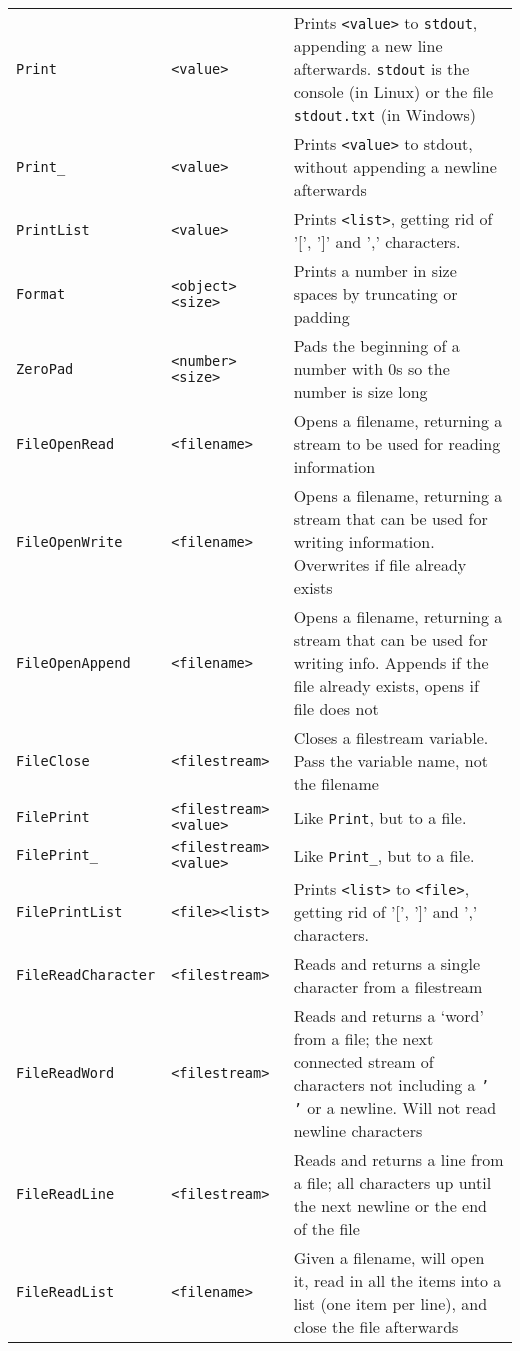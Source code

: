 \begin{longtable}{p{3cm}p{3cm}p{6cm}}
\verb+Print+ &\verb+<value>+ &Prints \verb+<value>+ to \texttt{stdout}, appending a new line afterwards. \texttt{stdout} is the console (in Linux) or the file \texttt{stdout.txt} (in Windows)\\ 
\verb+Print_+ &\verb+<value>+ &Prints \verb+<value>+ to stdout, without appending a newline afterwards\\ 
\verb+PrintList+&\verb+<value>+ &Prints \verb+<list>+, getting rid of '[', ']' and ',' characters.\\ 
\verb+Format+ &\verb+<object>+ \verb+<size>+ &Prints a number in size spaces by truncating or padding \\ 
\verb+ZeroPad+ &\verb+<number>+ \verb+<size>+ &Pads the beginning of a number with 0s so the number is size long\\
\verb+FileOpenRead+ &\verb+<filename>+ &Opens a filename, returning a stream to be used for reading information\\ 
\verb+FileOpenWrite+ &\verb+<filename>+ &Opens a filename, returning a stream that can be used for writing information. Overwrites if file already exists\\ 
\verb+FileOpenAppend+ &\verb+<filename>+ &Opens a filename, returning a stream that can be used for writing info. Appends if the file already exists, opens if file does not\\ 
\verb+FileClose+ &\verb+<filestream>+&Closes a filestream variable. Pass the variable name, not the filename\\ 
\verb+FilePrint+ &\verb+<filestream>+ \verb+<value>+ &Like \verb+Print+, but to a file.\\ 
\verb+FilePrint_+ &\verb+<filestream>+ \verb+<value>+ &Like \verb+Print_+, but to a file.\\ 
\verb+FilePrintList+&\verb+<file>+\verb+<list>+ &Prints \verb+<list>+ to \verb+<file>+, getting rid of '[', ']' and ',' characters.\\ 
\verb+FileReadCharacter+ &\verb+<filestream>+ &Reads and returns a single character from a filestream\\ 
\verb+FileReadWord+ &\verb+<filestream>+&Reads and returns a `word' from a file; the next connected stream of characters not including a \texttt{' '} or a newline. Will not read newline characters\\ 
\verb+FileReadLine+ &\verb+<filestream>+&Reads and returns a line from a file; all characters up until the next newline or the end of the file\\ 
\verb+FileReadList+ &\verb+<filename>+ &Given a filename, will open it, read in all the items into a list (one item per line), and close the file afterwards\\ 

\end{longtable}
